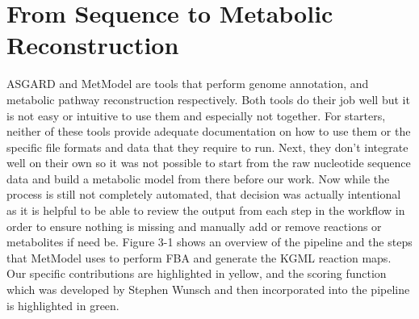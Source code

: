 
\chapter{From Sequence to Metabolic Reconstruction} %

\label{Chapter3} %

\indent\indent ASGARD and MetModel are tools that perform genome annotation, and metabolic pathway reconstruction respectively. Both tools do their job well but it is not easy or intuitive to use them and especially not together.  For starters, neither of these tools provide adequate documentation on how to use them or the specific file formats and data that they require to run.  Next, they don't integrate well on their own so it was not possible to start from the raw nucleotide sequence data and build a metabolic model from there before our work. Now while the process is still not completely automated, that decision was actually intentional as it is helpful to be able to review the output from each step in the workflow in order to ensure nothing is missing and manually add or remove reactions or metabolites if need be.  Figure 3-1 shows an overview of the pipeline and the steps that MetModel uses to perform FBA and generate the KGML reaction maps.  Our specific contributions are highlighted in yellow, and the scoring function which was developed by Stephen Wunsch and then incorporated into the pipeline is highlighted in green\citep{wunsch_stephen_a._scoring_2016}.\\
%
%
